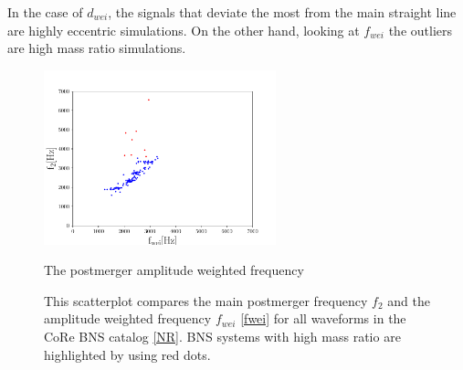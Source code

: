 In the case of $d_{wei}$, the signals that deviate the most from the main straight line are highly eccentric simulations. On the other hand, looking at  $f_{wei}$ the outliers are high mass ratio simulations.


\begin{figure}[hbt!]
\begin{center}
\includegraphics[width=0.6\textwidth, angle=0]{images/Data_analysis/results/f2.pdf}
\captionsetup{width=0.8\textwidth}
\caption{The postmerger amplitude weighted frequency}
\caption*{This scatterplot compares the main postmerger frequency $f_2$ and the amplitude weighted frequency $f_{wei}$ \ref{fwei} for all waveforms in the CoRe BNS catalog \ref{NR}. BNS systems with high mass ratio are highlighted by using red dots.}
\label{duration measure}
\end{center}
\end{figure}

\FloatBarrier









